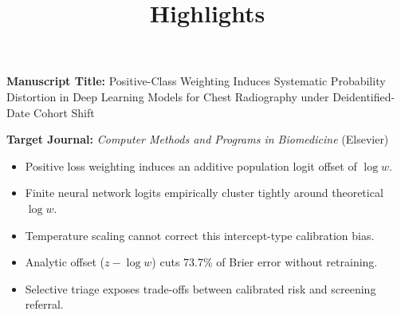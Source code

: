 \documentclass[11pt]{article}
\title{\textbf{Highlights}}
\date{}
\author{}
\begin{document}
\maketitle
\vspace{-2em}

\noindent\textbf{Manuscript Title:} Positive-Class Weighting Induces Systematic Probability Distortion in Deep Learning Models for Chest Radiography under Deidentified-Date Cohort Shift

\vspace{1.5em}
\noindent\textbf{Target Journal:} \textit{Computer Methods and Programs in Biomedicine} (Elsevier)

\vspace{2em}
\begin{itemize}
    \item Positive loss weighting induces an additive population logit offset of $\log w$.
    \item Finite neural network logits empirically cluster tightly around theoretical $\log w$.
    \item Temperature scaling cannot correct this intercept-type calibration bias.
    \item Analytic offset ($z - \log w$) cuts 73.7\% of Brier error without retraining.
    \item Selective triage exposes trade-offs between calibrated risk and screening referral.
\end{itemize}
\end{document}
